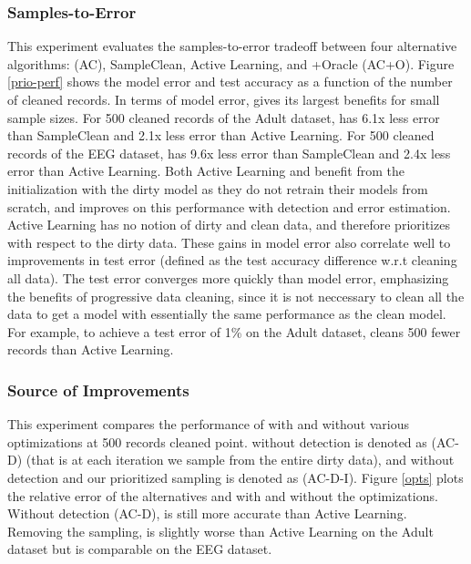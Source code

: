 \subsubsection{Samples-to-Error}
This experiment evaluates the samples-to-error tradeoff between four alternative algorithms: \sys (AC), SampleClean, Active Learning, and \sys+Oracle (AC+O).
Figure \ref{prio-perf} shows the model error and test accuracy as a function of the number of cleaned records.
In terms of model error, \sys gives its largest benefits for small sample sizes.
For 500 cleaned records of the Adult dataset, \sys has 6.1x less error than SampleClean and 2.1x less error than Active Learning.
For 500 cleaned records of the EEG dataset, \sys has 9.6x less error than SampleClean and 2.4x less error than Active Learning.
Both Active Learning and \sys benefit from the initialization with the dirty model as they do not retrain their models from scratch, and \sys improves on this performance with detection and error estimation.
Active Learning has no notion of dirty and clean data, and therefore prioritizes with respect to the dirty data.
These gains in model error also correlate well to improvements in test error (defined as the test accuracy difference w.r.t cleaning all data).
The test error converges more quickly than model error, emphasizing the benefits of progressive data cleaning, since it is not neccessary to clean all the data to get a model with essentially the same performance as the clean model.
For example, to achieve a test error of 1\% on the Adult dataset, \sys cleans 500 fewer records than Active Learning.

\subsubsection{Source of Improvements}\label{comp}
This experiment compares the performance of \sys with and without various optimizations at 500 records cleaned point. 
\sys without detection is denoted as (AC-D) (that is at each iteration we sample from the entire dirty data), and \sys without detection and our prioritized sampling is denoted as (AC-D-I).
Figure \ref{opts} plots the relative error of the alternatives and \sys with and without the optimizations.
Without detection (AC-D), \sys is still more accurate than Active Learning.
Removing the sampling, \sys is slightly worse than Active Learning on the Adult dataset but is comparable on the EEG dataset.

